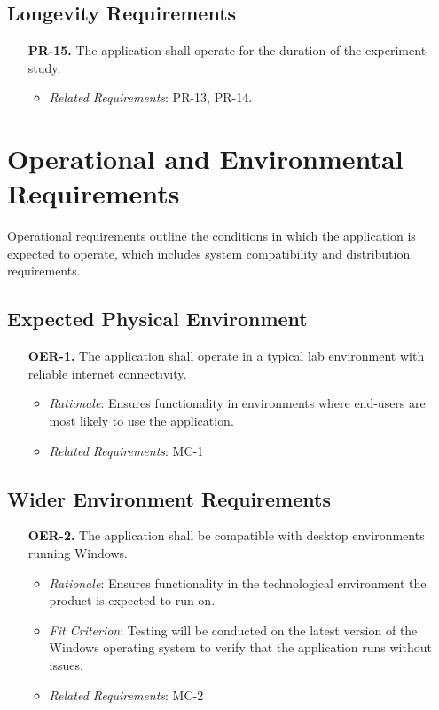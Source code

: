\documentclass[12pt]{article}
\begin{document}
\subsection{Longevity Requirements}
\begin{enumerate}
  \item[\textbf{PR-15.}] The application shall operate for the duration of the experiment study.
  \begin{itemize}
    \item \textit{Related Requirements}: PR-13, PR-14.
  \end{itemize}
\end{enumerate}

\section{Operational and Environmental Requirements}
Operational requirements outline the conditions in which the application is expected to operate, which includes system compatibility and distribution requirements.
\subsection{Expected Physical Environment}
\begin{enumerate}
  \item[\textbf{OER-1.}] The application shall operate in a typical lab environment with reliable internet connectivity.
    \begin{itemize}
      \item \textit{Rationale}: Ensures functionality in environments where end-users are most likely to use the application. 
      \item \textit{Related Requirements}: MC-1
    \end{itemize}
\end{enumerate}

\subsection{Wider Environment Requirements}
\begin{enumerate}
  \item[\textbf{OER-2.}] The application shall be compatible with desktop environments running Windows.
    \begin{itemize}
      \item \textit{Rationale}: Ensures functionality in the technological environment the product is expected to run on.
      \item \textit{Fit Criterion}: Testing will be conducted on the latest
      version of the Windows operating system to verify that the application
      runs without issues.
      \item \textit{Related Requirements}: MC-2
    \end{itemize}
\end{enumerate}
\end{document}
